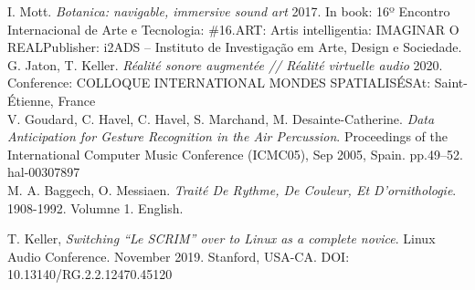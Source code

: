\documentclass[journal,onecolumn]{IEEEtran}
\begin{document}
\begin{thebibliography}{1}
I. Mott. \emph{Botanica: navigable, immersive sound art} 
2017. In book: 16º Encontro Internacional de Arte e Tecnologia: \#16.ART: Artis intelligentia: IMAGINAR O REALPublisher: i2ADS – Instituto de Investigação em Arte, Design e Sociedade. \\

G. Jaton, T. Keller. \emph{Réalité sonore augmentée // Réalité virtuelle audio} 2020. Conference: COLLOQUE INTERNATIONAL MONDES SPATIALISÉSAt: Saint-Étienne, France \\

V. Goudard, C. Havel, C. Havel, S. Marchand, M. Desainte-Catherine. \emph{Data Anticipation for Gesture Recognition in the Air Percussion}. Proceedings of the International Computer Music Conference (ICMC05), Sep 2005, Spain. pp.49–52. hal-00307897 \\

M. A. Baggech, O. Messiaen. \emph{Traité De Rythme, De Couleur, Et D'ornithologie}. 1908-1992. Volumne 1. English.

T. Keller,  \emph{Switching ``Le SCRIM'' over to Linux as a complete novice}. Linux Audio Conference. November 2019. Stanford, USA-CA. DOI: 10.13140/RG.2.2.12470.45120

\end{thebibliography}

% 



\end{document}
